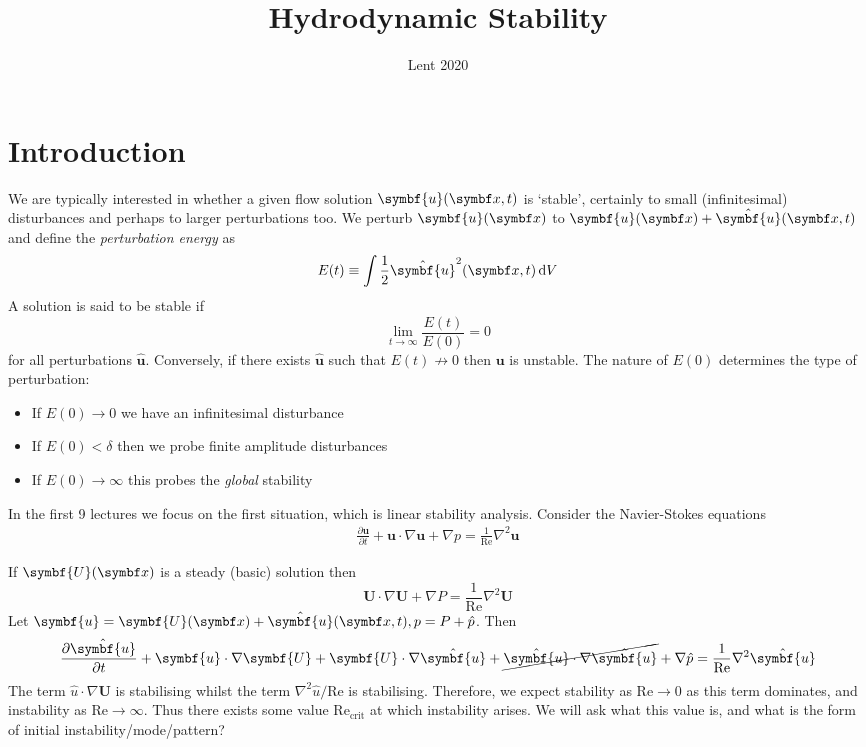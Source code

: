 \documentclass{jknotes}
\renewcommand{\u}{\symbf{u}}
\begin{document}
\title{Hydrodynamic Stability}
\date{Lent 2020}

\maketitle
\suggestionsspiel
\tableofcontents

\section{Introduction}
We are typically interested in whether a given flow solution $\u(\x,t)$ is
`stable', certainly to small (infinitesimal) disturbances and perhaps to
larger perturbations too. We perturb $\u(\x)$ to $\u(\x) + \hat{\u}(\x,t)$ and
define the \emph{perturbation energy} as
\begin{equation}
	E(t) \equiv \int \frac{1}{2}\hat{\u}^2(\x,t) \, \diffd V
\end{equation}
A solution is said to be stable if
\begin{equation}
	\lim_{t \to \infty} \frac{E(t)}{E(0)} = 0
\end{equation}
for all perturbations $\hat{\u}$. Conversely, if there exists $\hat{\u}$ such
that $E(t) \not\rightarrow 0$ then $\u$ is unstable. The nature of $E(0)$
determines the type of perturbation:
\begin{itemize}
	\item If $E(0) \to 0$ we have an infinitesimal disturbance
	\item If $E(0) < \delta$ then we probe finite amplitude disturbances
	\item If $E(0) \to \infty$ this probes the \emph{global} stability
\end{itemize}

In the first 9 lectures we focus on the first situation, which is linear
stability analysis. Consider the Navier-Stokes equations
\begin{align}
	\frac{\partial \u}{\partial t} + \u \cdot \nabla \u + \nabla p =
	\frac{1}{\text{Re}} \nabla^2 \u
\end{align}

If $\symbf{U}(\x)$ is a steady (basic) solution then
\begin{equation}
	\symbf{U}\cdot\nabla\symbf{U} + \nabla P = \frac{1}{\text{Re}} \nabla^2
	\symbf{U}
\end{equation}
Let $\u = \symbf{U}(\x) + \hat{\u}(\x,t), p = P + \hat{p}$. Then
\begin{equation}
	\frac{\partial \hat{\u}}{\partial t} + \u \cdot \nabla \symbf{U} +
	\symbf{U} \cdot \nabla \hat{\u} + \cancel{\hat{\u}\cdot\nabla\hat{\u}} +
	\nabla \hat{p} = \frac{1}{\text{Re}} \nabla^2 \hat{\u}
\end{equation}
The term $\hat{u}\cdot\nabla \symbf{U}$ is stabilising whilst the term
$\nabla^2 \hat{u} / \text{Re}$ is stabilising. Therefore, we expect stability
as $\text{Re} \to 0$ as this term dominates, and instability as $\text{Re} \to
\infty$. Thus there exists some value $\text{Re}_{\text{crit}}$ at which
instability arises. We will ask what this value is, and what is the form of initial
instability/mode/pattern?
\end{document}
